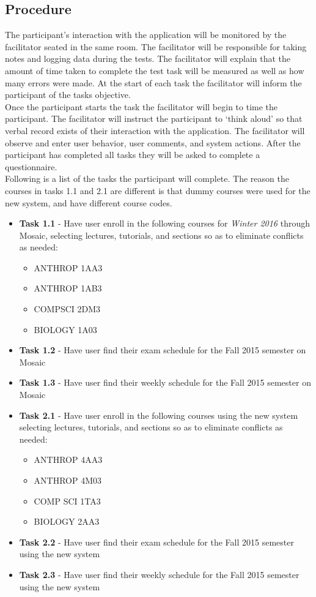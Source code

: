 \documentclass[10pt]{article}
\begin{document}
\begin{multicols}{2}
\subsection*{Procedure}
The participant's interaction with the application will be monitored by the facilitator seated in the same room. The facilitator will be responsible for taking notes and logging data during the tests.
The facilitator will explain that the amount of time taken to complete the test task will be measured as well as how many errors were made. At the start of each task the facilitator will inform the participant of the tasks objective.\\

Once the participant starts the task the facilitator will begin to time the participant.  The facilitator will instruct the participant to `think aloud' so that verbal record exists of their interaction with the application. The facilitator will observe and enter user behavior, user comments, and system actions. After the participant has completed all tasks they will be asked to complete a questionnaire.\\

Following is a list of the tasks the participant will complete. The reason the courses in tasks 1.1 and 2.1 are different is that dummy courses were used for the new system, and have different course codes.
\begin{itemize}
\item \textbf{Task 1.1} - Have user enroll in the following courses for \emph{Winter 2016} through Mosaic, selecting lectures, tutorials, and sections so as to eliminate conflicts as needed:
\begin{itemize}
\item ANTHROP 1AA3
\item ANTHROP 1AB3
\item COMPSCI 2DM3
\item BIOLOGY 1A03
\end{itemize}
\item \textbf{Task 1.2} - Have user find their exam schedule for the Fall 2015 semester on Mosaic 
\item \textbf{Task 1.3} - Have user find their weekly schedule for the Fall 2015 semester on Mosaic
\item \textbf{Task 2.1} -  Have user enroll in the following courses using the new system selecting lectures, tutorials, and sections so as to eliminate conflicts as needed:
\begin{itemize}
\item ANTHROP 4AA3
\item ANTHROP 4M03
\item COMP SCI 1TA3
\item BIOLOGY 2AA3
\end{itemize}
\item \textbf{Task 2.2} - Have user find their exam schedule for the Fall 2015 semester using the new system
\item \textbf{Task 2.3} - Have user find their weekly schedule for the Fall 2015 semester using the new system
\end{itemize}


\end{multicols}
\end{document}
